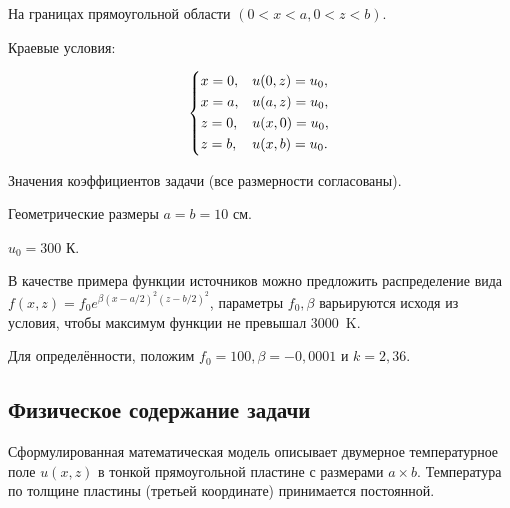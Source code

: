 \documentclass[12pt, a4paper]{article}
\begin{document}
На границах прямоугольной области $(0 < x < a, 0 < z < b)$.

\begin{center}
\end{center}

Краевые условия:

\begin{equation}
	\begin{dcases}
		x = 0, & u(0, z) = u_0, \\
		x = a, & u(a, z) = u_0, \\
		z = 0, & u(x, 0) = u_0, \\
		z = b, & u(x, b) = u_0. \\
	\end{dcases}
\end{equation}

Значения коэффициентов задачи (все размерности согласованы).

Геометрические размеры $a = b = 10$ см.

$u_0 = 300$ К.

В качестве примера функции источников можно предложить распределение вида $f(x, z) = f_0 e^{\beta(x - a/2)^2(z - b/2)^2}$, параметры $f_0, \beta$ варьируются исходя из условия, чтобы максимум функции не превышал $3000$~K.

Для определённости, положим $f_0 = 100, \beta = -0,0001$ и $k = 2,36$.

\subsection{Физическое содержание задачи}

Сформулированная математическая модель описывает двумерное температурное поле $u(x, z)$ в тонкой прямоугольной пластине с размерами $a \times b$.
Температура по толщине пластины (третьей координате) принимается постоянной.
\end{document}
